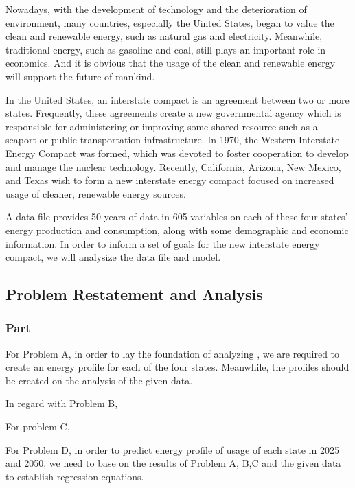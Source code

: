 \documentclass[a4paper,11pt]{article}
\begin{document}
\par Nowadays, with the development of technology and the deterioration of environment, many countries, especially the Uinted States, began to value the clean and renewable energy, such as natural gas and electricity. Meanwhile, traditional energy, such as gasoline and coal, still plays an important role in economics. And it is obvious that the usage of the clean and renewable energy will support the future of mankind.
\par In the United States, an interstate compact is an agreement between two or more states. Frequently, these agreements create a new governmental agency which is responsible for administering or improving some shared resource such as a seaport or public transportation infrastructure.\cite{1} In 1970, the Western Interstate Energy Compact was formed, which was devoted to foster cooperation to develop and manage the nuclear technology. Recently, California, Arizona, New Mexico, and Texas wish to form a new interstate energy compact focused on increased usage of cleaner, renewable energy sources. 
\par A data file provides 50 years of data in 605 variables on each of these four states' energy production and consumption, along with some demographic and economic information. In order to inform a set of goals for the new interstate energy compact, we will analysize the data file and model.





\subsection{Problem Restatement and Analysis}
\subsubsection{Part \uppercase\expandafter{}}
\par For Problem A, in order to lay the foundation of analyzing , we are required to create an energy profile for each of the four states. Meanwhile, the profiles should be created on the analysis of the given data.

\par In regard with Problem B, 

\par For problem C, 

\par For Problem D, in order to predict energy profile of usage of each state in 2025 and 2050, we need to base on the results of Problem A, B,C and the given data to establish regression equations.
\end{document}
